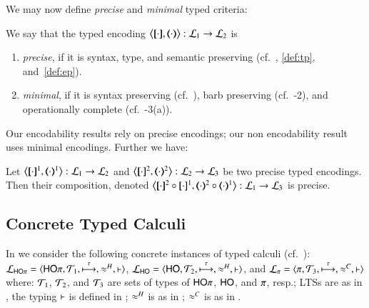 We may now define \emph{precise} and \emph{minimal} typed criteria: 

 

\begin{definition}\rm\label{def:goodenc}
We say that 
	the typed encoding 
	$\enco{\map{\cdot}, \mapt{\cdot} %
	}: \tyl{L}_1 \to \tyl{L}_2$ is 
	\begin{enumerate}[$\bullet$]
	\item \emph{precise}, if it is syntax, type, and semantic preserving (cf.~, \ref{def:tp}, and~\ref{def:ep}).
	\item \emph{minimal}, if it is syntax preserving 
	(cf.~),
	barb preserving (cf.~-2), 
	and operationally complete (cf.~-3(a)).
	\end{enumerate}
\end{definition}

\smallskip 

\noi %
Our encodability results %
rely on precise encodings; 
our non encodability result %
uses minimal encodings.
Further we have:

\smallskip 

\begin{proposition}\rm
	\label{pro:composition}
	Let %
	$\enco{\map{\cdot}^{1}, \mapt{\cdot}^{1}%
	}: \tyl{L}_1 \to \tyl{L}_2$
	and 
	$\enco{\map{\cdot}^{2}, \mapt{\cdot}^{2}%
	}: \tyl{L}_2 \to \tyl{L}_3$
	be two precise typed encodings.
	Then their composition, denoted 
	$\enco{\map{\cdot}^{2} \circ \map{\cdot}^{1}, \mapt{\cdot}^{2} \circ \mapt{\cdot}^{1} %
	}: \tyl{L}_1 \to \tyl{L}_3$
	is precise. 
\end{proposition}

\smallskip

\subsection{Concrete Typed Calculi}
In  %
we consider the following concrete instances of typed calculi (cf.~):
\\
%
	$\mathcal{L}_{\mathsf{HO}\pi}=\langle \mathsf{HO}\pi, {\cal{T}}_1, \stackrel{\tau}{\longmapsto}, \approx^H, \vdash \rangle$,
	$\mathcal{L}_{\mathsf{HO}}=\langle \mathsf{HO}, {\cal{T}}_2, \stackrel{\tau}{\longmapsto}, \approx^H, \vdash \rangle$, and
	$\mathcal{L}_{\pi}=\langle \pi, {\cal{T}}_3, \stackrel{\tau}{\longmapsto}, \approx^C, \vdash \rangle$ 
%
where: 
${\cal{T}}_1$, ${\cal{T}}_2$, 
and ${\cal{T}}_3$
are sets of types of $\mathsf{HO}\pi$, $\mathsf{HO}$, and $\pi$, resp.;
LTSs are as in , 
the typing $\vdash$ is defined in 
;  
$\approx^H$ is as in ; 
$\approx^C$ is as in .


